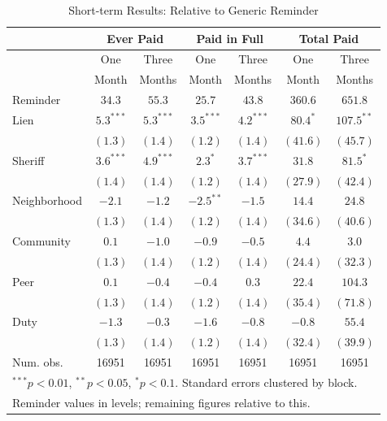 \documentclass[12pt]{article}
\begin{document}
\begin{table}[htbp]
\caption{Short-term Results: Relative to Generic Reminder}
\begin{center}
\begin{tabular}{l c c c c c c }
\hline
 & \multicolumn{2}{c}{Ever Paid} & \multicolumn{2}{c}{Paid in Full} & \multicolumn{2}{c}{Total Paid} \\
\hline
 & One & Three & One & Three & One & Three \\
 & Month & Months & Month & Months & Month & Months \\
\hline
Reminder     & $34.3$ & $55.3$ & $25.7$ & $43.8$ & $360.6$ & $651.8$ \\
\hline
Lien         & $5.3^{***}$  & $5.3^{***}$  & $3.5^{***}$  & $4.2^{***}$  & $80.4^{*}$    & $107.5^{**}$  \\
             & $(1.3)$      & $(1.4)$      & $(1.2)$      & $(1.4)$      & $(41.6)$      & $(45.7)$      \\
Sheriff      & $3.6^{***}$  & $4.9^{***}$  & $2.3^{*}$    & $3.7^{***}$  & $31.8$        & $81.5^{*}$    \\
             & $(1.4)$      & $(1.4)$      & $(1.2)$      & $(1.4)$      & $(27.9)$      & $(42.4)$      \\
Neighborhood & $-2.1$       & $-1.2$       & $-2.5^{**}$  & $-1.5$       & $14.4$        & $24.8$        \\
             & $(1.3)$      & $(1.4)$      & $(1.2)$      & $(1.4)$      & $(34.6)$      & $(40.6)$      \\
Community    & $0.1$        & $-1.0$       & $-0.9$       & $-0.5$       & $4.4$         & $3.0$         \\
             & $(1.3)$      & $(1.4)$      & $(1.2)$      & $(1.4)$      & $(24.4)$      & $(32.3)$      \\
Peer         & $0.1$        & $-0.4$       & $-0.4$       & $0.3$        & $22.4$        & $104.3$       \\
             & $(1.3)$      & $(1.4)$      & $(1.2)$      & $(1.4)$      & $(35.4)$      & $(71.8)$      \\
Duty         & $-1.3$       & $-0.3$       & $-1.6$       & $-0.8$       & $-0.8$        & $55.4$        \\
             & $(1.3)$      & $(1.4)$      & $(1.2)$      & $(1.4)$      & $(32.4)$      & $(39.9)$      \\
\hline
Num. obs.    & 16951        & 16951        & 16951        & 16951        & 16951         & 16951         \\
\hline
\multicolumn{7}{l}{\scriptsize{$^{***}p<0.01$, $^{**}p<0.05$, $^*p<0.1$. Standard errors clustered by block.}} \\
\multicolumn{7}{l}{\scriptsize{Reminder values in levels; remaining figures relative to this.}}
\end{tabular}
\label{sh_lpm_rob}
\end{center}
\end{table}
\end{document}
